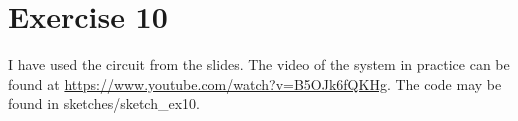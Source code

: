 \part*{Exercise 10}
I have used the circuit from the slides. The video of the system in practice can be found at \url{https://www.youtube.com/watch?v=B5OJk6fQKHg}. The code may be found in sketches/sketch\_ex10.